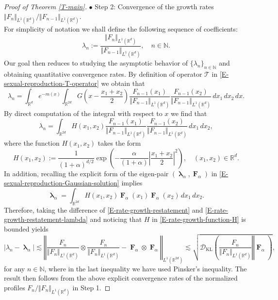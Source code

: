 \documentclass[reqno]{amsart}
\DeclareMathOperator{\blambda}{\boldsymbol{\lambda}}
\DeclareMathOperator{\bF}{\boldsymbol{F}}
\numberwithin{equation}{section}
\begin{document}
{\begin{proof}[Proof of Theorem \ref{T-main}]
$\bullet$ {\sc Step 2}: Convergence of the growth rates $\Vert F_n\Vert_{L^1(\mathbb{R}^d)}/\Vert F_{n-1}\Vert_{L^1(\mathbb{R}^d)}$.\\
For simplicity of notation we shall define the following sequence of coefficients: 
$$\lambda_n:=\frac{\Vert F_n\Vert_{L^1(\mathbb{R}^d)}}{\Vert F_{n-1}\Vert_{L^1(\mathbb{R}^d)}},\quad n\in \mathbb{N}.$$
Our goal then reduces to studying the asymptotic behavior of $\{\lambda_n\}_{n\in \mathbb{N}}$ and obtaining quantitative convergence rates. By definition of operator $\mathcal{T}$ in \eqref{E-sexual-reproduction-T-operator} we obtain that
$$\lambda_n=\int_{\mathbb{R}^d}e^{-m(x)}\int_{\mathbb{R}^{2d}}G\left(x-\frac{x_1+x_2}{2}\right)\frac{F_{n-1}(x_1)}{\Vert F_{n-1}\Vert_{L^1(\mathbb{R}^d)}}\frac{F_{n-1}(x_2)}{\Vert F_{n-1}\Vert_{L^1(\mathbb{R}^d)}}\,dx_1\,dx_2\,dx.$$
By direct computation of the integral with respect to $x$ we find that
\begin{equation}\label{E-rate-growth-restatement}
\lambda_n=\int_{\mathbb{R}^{2d}}H(x_1,x_2)\frac{F_{n-1}(x_1)}{\Vert F_{n-1}\Vert_{L^1(\mathbb{R}^d)}}\frac{F_{n-1}(x_2)}{\Vert F_{n-1}\Vert_{L^1(\mathbb{R}^d)}}\,dx_1\,dx_2,
\end{equation}
where the function $H(x_1,x_2)$ takes the form
\begin{equation}\label{E-rate-growth-function-H}
H(x_1,x_2):=\frac{1}{(1+\alpha)^{d/2}}\exp\left(-\frac{\alpha}{(1+\alpha)}\left\vert \frac{x_1+x_2}{2}\right\vert^2\right),\quad (x_1,x_2)\in \mathbb{R}^d.
\end{equation}
In addition, recalling the explicit form of the eigen-pair $(\blambda_\alpha,\bF_\alpha)$ in \eqref{E-sexual-reproduction-Gaussian-solution} implies 
\begin{equation}\label{E-rate-growth-restatement-lambda}
\blambda_\alpha=\int_{\mathbb{R}^{2d}}H(x_1,x_2)\bF_\alpha(x_1)\bF_\alpha(x_2)\,dx_1\,dx_2.
\end{equation}
Therefore, taking the difference of \eqref{E-rate-growth-restatement} and \eqref{E-rate-growth-restatement-lambda} and noticing that $H$ in \eqref{E-rate-growth-function-H} is bounded yields
$$\vert \lambda_n-\blambda_\alpha\vert\lesssim \left\Vert \frac{F_n}{\Vert F_n\Vert_{L^1(\mathbb{R}^d)}}\otimes \frac{F_n}{\Vert F_n\Vert_{L^1(\mathbb{R}^d)}}-\bF_\alpha\otimes \bF_\alpha\right\Vert_{L^1(\mathbb{R}^{2d})}\lesssim \sqrt{\mathcal{D}_{\text{KL}}\left(\left.\frac{F_n}{\Vert F_n\Vert_{L^1(\mathbb{R}^d)}}\right\Vert \bF_\alpha\right)},$$
for any $n\in \mathbb{N}$, where in the last inequality we have used Pinsker's inequality. The result then follows from the above explicit convergence rates of the normalized profiles $F_n/\Vert F_n\Vert_{L^1(\mathbb{R}^d)}$ in {\sc Step 1}.
\end{proof}


}
\end{document}
